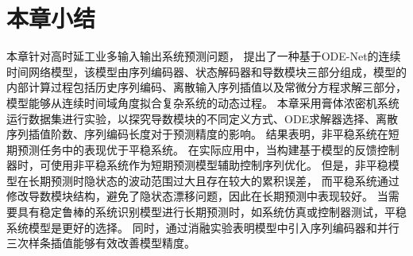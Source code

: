 \section{本章小结}
\label{sec:conc}
本章针对高时延工业多输入输出系统预测问题，
提出了一种基于ODE-Net的连续时间网络模型，该模型由序列编码器、状态解码器和导数模块三部分组成，模型的内部计算过程包括历史序列编码、离散输入序列插值以及常微分方程求解三部分，模型能够从连续时间域角度拟合复杂系统的动态过程。
本章采用膏体浓密机系统运行数据集进行实验，以探究导数模块的不同定义方式、ODE求解器选择、离散序列插值阶数、序列编码长度对于预测精度的影响。
结果表明，非平稳系统在短期预测任务中的表现优于平稳系统。
在实际应用中，当构建基于模型的反馈控制器时，可使用非平稳系统作为短期预测模型辅助控制序列优化。
但是，非平稳模型在长期预测时隐状态的波动范围过大且存在较大的累积误差，
而平稳系统通过修改导数模块结构，避免了隐状态漂移问题，因此在长期预测中表现较好。
当需要具有稳定鲁棒的系统识别模型进行长期预测时，如系统仿真或控制器测试，平稳系统模型是更好的选择。
同时，通过消融实验表明模型中引入序列编码器和并行三次样条插值能够有效改善模型精度。


